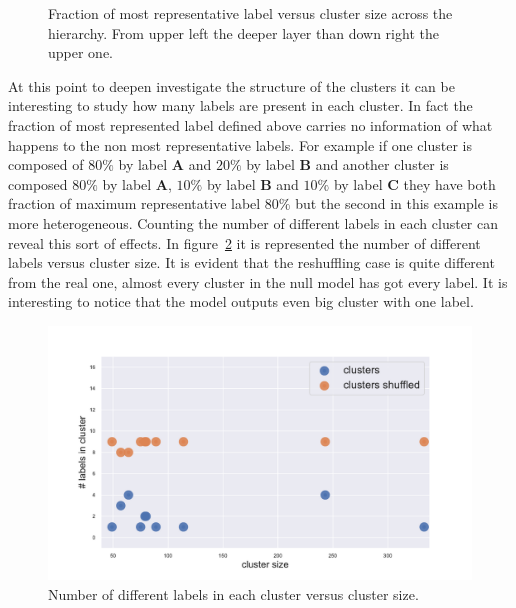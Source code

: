 \begin{figure}[htb!]
\begin{minipage}{0.45\textwidth}
	\end{minipage}
	\caption{Fraction of most representative label versus cluster size across the hierarchy. From upper left the deeper layer than down right the upper one.}
	\label{fig:topic/gtex/oversigma_10tissue/shuffledclusterhomosize_l*}
\end{figure}


At this point to deepen investigate the structure of the clusters it can be interesting to study how many labels are present in each cluster. In fact the fraction of most represented label defined above carries no information of what happens to the non most representative labels. For example if one cluster is composed of $80\%$ by label \textbf{A} and $20\%$ by label \textbf{B} and another cluster is composed $80\%$ by label \textbf{A}, $10\%$ by label \textbf{B} and $10\%$ by label \textbf{C} they have both fraction of maximum representative label $80\%$ but the second in this example is more heterogeneous. Counting the number of different labels in each cluster can reveal this sort of effects. In figure~\ref{fig:topic/gtex/oversigma_10tissue/shuffledcluster_shuffle_label_size_l3_primary_site} it is represented the number of different labels versus cluster size. It is evident that the reshuffling case is quite different from the real one, almost every cluster in the null model has got every label. It is interesting to notice that the model outputs even big cluster with one label.
\begin{figure}[htb!]
    \centering
    \includegraphics[width=0.9\linewidth]{pictures/topic/gtex/oversigma_10tissue/shuffledcluster_shuffle_label_size_l3_primary_site.pdf}
    \caption{Number of different labels in each cluster versus cluster size.}
    \label{fig:topic/gtex/oversigma_10tissue/shuffledcluster_shuffle_label_size_l3_primary_site}
\end{figure}
